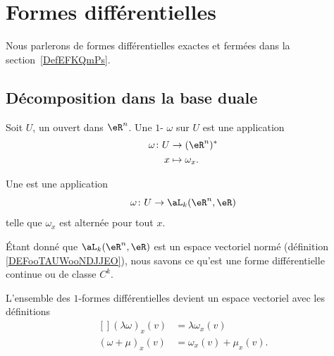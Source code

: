 
\section{Formes différentielles}
\label{SecFormDiffRappel}

Nous parlerons de formes différentielles exactes et fermées dans la section~\ref{DefEFKQmPs}.

\subsection{Décomposition dans la base duale}

\begin{definition}      \label{DEFooMGXSooWioKie}
	Soit \( U\), un ouvert dans \( \eR^n\). Une \( 1\)- \( \omega\) sur \( U\) est une application
	\begin{equation}
		\begin{aligned}
			\omega\colon U & \to (\eR^n)^*     \\
			x              & \mapsto \omega_x.
		\end{aligned}
	\end{equation}

	Une  est une application
	\begin{equation}
		\omega \colon U\to \aL_k(\eR^n,\eR)
	\end{equation}
	telle que \( \omega_x\) est alternée pour tout \( x\).

	Étant donné que \( \aL_k(\eR^n,\eR)\) est un espace vectoriel normé (définition \ref{DEFooTAUWooNDJJEO}), nous savons ce qu'est une forme différentielle continue ou de classe \( C^k\).
\end{definition}

\begin{remark}      \label{REMooSKKSooDZFMAr}
	L'ensemble des \( 1\)-formes différentielles devient un espace vectoriel avec les définitions
	\begin{equation}
		\begin{aligned}[]
			(\lambda\omega)_x(v) & =\lambda\omega_x(v)    \\
			(\omega+\mu)_x(v)    & =\omega_x(v)+\mu_x(v).
		\end{aligned}
	\end{equation}
\end{remark}

